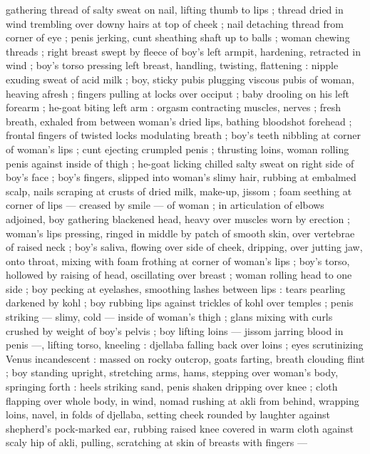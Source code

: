 {gathering thread of salty sweat on nail, lifting thumb to lips ; thread 
dried in wind trembling over downy hairs at top of cheek ; nail 
detaching thread from corner of eye ; penis jerking, cunt sheathing 
shaft up to balls ; woman chewing threads ; right breast swept by 
fleece of boy's left armpit, hardening, retracted in wind ; boy's torso 
pressing left breast, handling, twisting, flattening : nipple exuding 
sweat of acid milk ; boy, sticky pubis plugging viscous pubis of 
woman, heaving afresh ; fingers pulling at locks over occiput ; baby 
drooling on his left forearm ; he-goat biting left arm : orgasm 
contracting muscles, nerves ; fresh breath, exhaled from between 
woman's dried lips, bathing bloodshot forehead ; frontal fingers of 
twisted locks modulating breath ; boy's teeth nibbling at corner of 
woman's lips ; cunt ejecting crumpled penis ; thrusting loins, woman 
rolling penis against inside of thigh ; he-goat licking chilled salty 
sweat on right side of boy's face ; boy's fingers, slipped into 
woman's slimy hair, rubbing at embalmed scalp, nails scraping at 
crusts of dried milk, make-up, jissom ; foam seething at corner of 
lips --- creased by smile --- of woman ; in articulation of elbows 
adjoined, boy gathering blackened head, heavy over muscles worn 
by erection ; woman's lips pressing, ringed in middle by patch of 
smooth skin, over vertebrae of raised neck ; boy's saliva, flowing 
over side of cheek, dripping, over jutting jaw, onto throat, mixing with 
foam frothing at corner of woman's lips ; boy's torso, hollowed by 
raising of head, oscillating over breast ; woman rolling head to one 
side ; boy pecking at eyelashes, smoothing lashes between lips : 
tears pearling darkened by kohl ; boy rubbing lips against trickles of 
kohl over temples ; penis striking --- slimy, cold --- inside of 
woman's thigh ; glans mixing with curls crushed by weight of boy's 
pelvis ; boy lifting loins --- jissom jarring blood in penis ---, lifting 
torso, kneeling : djellaba falling back over loins ; eyes scrutinizing 
Venus incandescent : massed on rocky outcrop, goats farting, breath 
clouding flint ; boy standing upright, stretching arms, hams, stepping 
over woman's body, springing forth : heels striking sand, penis 
shaken dripping over knee ; cloth flapping over whole body, in wind, 
nomad rushing at akli from behind, wrapping loins, navel, in folds of 
djellaba, setting cheek rounded by laughter against shepherd's 
pock-marked ear, rubbing raised knee covered in warm cloth against 
scaly hip of akli, pulling, scratching at skin of breasts with fingers --- 
}
